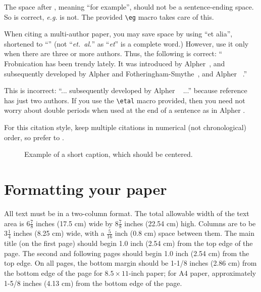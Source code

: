 \documentclass[10pt,twocolumn,letterpaper]{article}
\begin{document}
The space after \eg, meaning ``for example'', should not be a
sentence-ending space. So \eg is correct, {\em e.g.} is not.  The provided
\verb'\eg' macro takes care of this.

When citing a multi-author paper, you may save space by using ``et alia'',
shortened to ``\etal'' (not ``{\em et.\ al.}'' as ``{\em et}'' is a complete word.)
However, use it only when there are three or more authors.  Thus, the
following is correct: ``
   Frobnication has been trendy lately.
   It was introduced by Alpher~\cite{Alpher02}, and subsequently developed by
   Alpher and Fotheringham-Smythe~\cite{Alpher03}, and Alpher \etal~\cite{Alpher04}.''

This is incorrect: ``... subsequently developed by Alpher \etal~\cite{Alpher03} ...''
because reference~\cite{Alpher03} has just two authors.  If you use the
\verb'\etal' macro provided, then you need not worry about double periods
when used at the end of a sentence as in Alpher \etal.

For this citation style, keep multiple citations in numerical (not
chronological) order, so prefer \cite{Alpher03,Alpher02,Authors14} to
\cite{Alpher02,Alpher03,Authors14}.


\begin{figure}
\begin{center}
\fbox{\rule{0pt}{2in} \rule{.9\linewidth}{0pt}}
\end{center}
   \caption{Example of a short caption, which should be centered.}
\label{fig:short}
\end{figure}

\section{Formatting your paper}

All text must be in a two-column format. The total allowable width of the
text area is $6\frac78$ inches (17.5 cm) wide by $8\frac78$ inches (22.54
cm) high. Columns are to be $3\frac14$ inches (8.25 cm) wide, with a
$\frac{5}{16}$ inch (0.8 cm) space between them. The main title (on the
first page) should begin 1.0 inch (2.54 cm) from the top edge of the
page. The second and following pages should begin 1.0 inch (2.54 cm) from
the top edge. On all pages, the bottom margin should be 1-1/8 inches (2.86
cm) from the bottom edge of the page for $8.5 \times 11$-inch paper; for A4
paper, approximately 1-5/8 inches (4.13 cm) from the bottom edge of the
page.
\end{document}
